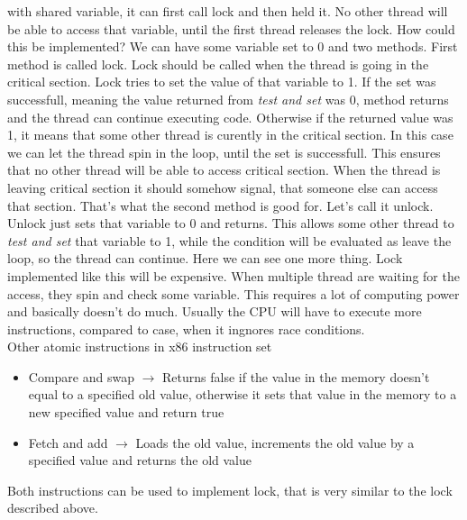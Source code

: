 \documentclass[a4paper]{article}
\begin{document}
with shared variable, it can first call lock and then held it. No other thread will be able
to access that variable, until the first thread releases the lock. How could this be
implemented? We can have some variable set to 0 and two methods. First method is called lock.
Lock should be called when the thread is going in the critical section. Lock tries to set
the value of that variable to 1. If the set was successfull, meaning the value returned 
from \textit{test and set} was 0, method returns and the thread can continue executing code.
Otherwise if the returned value was 1, it means that some other thread is curently in the
critical section. In this case we can let the thread spin in the loop, until
the set is successfull. This ensures that no other thread will be able to access critical
section. When the thread is leaving critical section it should somehow signal, that
someone else can access that section. That's what the second method is good for. Let's call
it unlock. Unlock just sets that variable to 0 and returns. This allows some other thread
to \textit{test and set} that variable to 1, while the condition will be evaluated as leave
the loop, so the thread can continue. Here we can see one more thing. Lock implemented 
like this will be expensive. When multiple thread are waiting for the access, they spin
and check some variable. This requires a lot of computing power and basically doesn't do much.
Usually the CPU will have to execute more instructions, compared to case, when it ingnores 
race conditions. \\
Other atomic instructions in x86 instruction set 
\begin{itemize}
  \item{Compare and swap $\rightarrow$ Returns false if the value in the memory doesn't equal
    to a specified old value, otherwise it sets that value in the memory to a new specified value
    and return true}
  \item{Fetch and add $\rightarrow$ Loads the old value, increments the old value by a specified 
    value and returns the old value}
\end{itemize}

\noindent Both instructions can be used to implement lock, that is very similar to the lock described 
above.\cite{c2}

\newpage
\printbibliography
\end{document}
